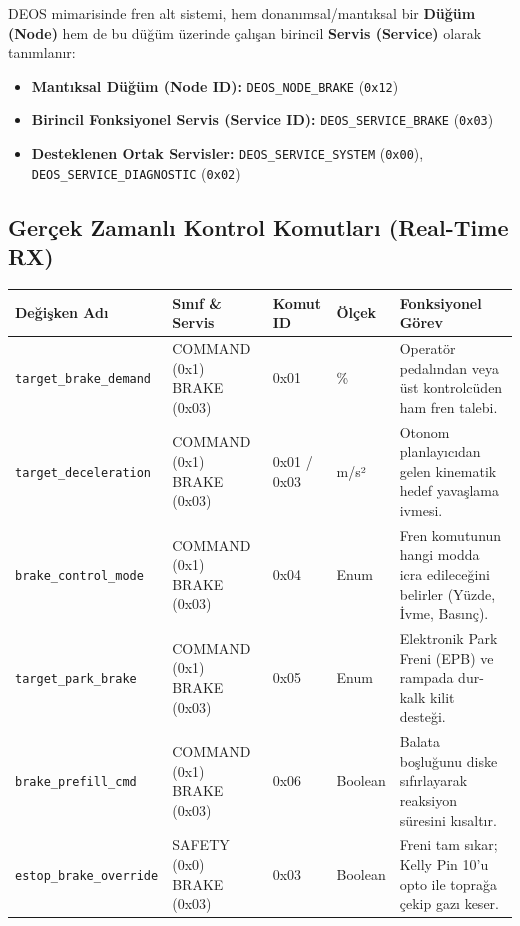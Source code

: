 \documentclass[a4paper,10pt]{article}
\newcommand{\hex}[1]{\texttt{0x#1}}
\newcommand{\code}[1]{\texttt{#1}}
\begin{document}
DEOS mimarisinde fren alt sistemi, hem donanımsal/mantıksal bir \textbf{Düğüm (Node)} hem de bu düğüm üzerinde çalışan birincil \textbf{Servis (Service)} olarak tanımlanır:

\begin{itemize}
    \item \textbf{Mantıksal Düğüm (Node ID):} \code{DEOS\_NODE\_BRAKE} (\hex{12})
    \item \textbf{Birincil Fonksiyonel Servis (Service ID):} \code{DEOS\_SERVICE\_BRAKE} (\hex{03})
    \item \textbf{Desteklenen Ortak Servisler:} \code{DEOS\_SERVICE\_SYSTEM} (\hex{00}), \code{DEOS\_SERVICE\_DIAGNOSTIC} (\hex{02})
\end{itemize}

\subsection{Gerçek Zamanlı Kontrol Komutları (Real-Time RX)}

\begin{center}
\begin{tabularx}{\textwidth}{>{\raggedright\arraybackslash}p{3.8cm} >{\raggedright\arraybackslash}p{3cm} >{\raggedright\arraybackslash}p{2.2cm} >{\raggedright\arraybackslash}p{2.2cm} X}
\toprule
\textbf{Değişken Adı} & \textbf{Sınıf \& Servis} & \textbf{Komut ID} & \textbf{Ölçek} & \textbf{Fonksiyonel Görev} \\
\midrule
\code{target\_brake\_demand} & COMMAND (0x1) BRAKE (0x03) & 0x01 & 0.01 \% & Operatör pedalından veya üst kontrolcüden ham fren talebi. \\
\code{target\_deceleration} & COMMAND (0x1) BRAKE (0x03) & 0x01 / 0x03 & 0.01 m/s² & Otonom planlayıcıdan gelen kinematik hedef yavaşlama ivmesi. \\
\code{brake\_control\_mode} & COMMAND (0x1) BRAKE (0x03) & 0x04 & Enum & Fren komutunun hangi modda icra edileceğini belirler (Yüzde, İvme, Basınç). \\
\code{target\_park\_brake} & COMMAND (0x1) BRAKE (0x03) & 0x05 & Enum & Elektronik Park Freni (EPB) ve rampada dur-kalk kilit desteği. \\
\code{brake\_prefill\_cmd} & COMMAND (0x1) BRAKE (0x03) & 0x06 & Boolean & Balata boşluğunu diske sıfırlayarak reaksiyon süresini kısaltır. \\
\code{estop\_brake\_override} & SAFETY (0x0) BRAKE (0x03) & 0x03 & Boolean & Freni tam sıkar; Kelly Pin 10'u opto ile toprağa çekip gazı keser. \\
\bottomrule
\end{tabularx}
\end{center}
\end{document}
